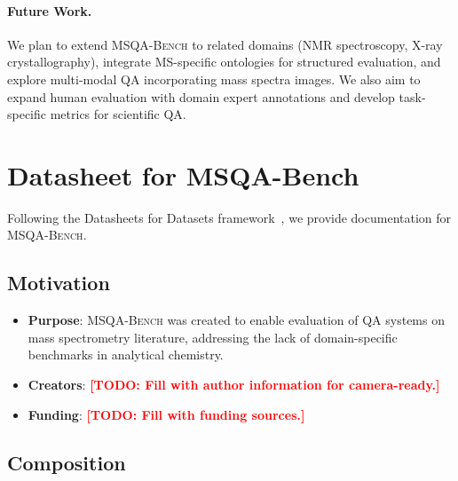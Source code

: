\documentclass[11pt]{article}
\newcommand{\msqa}{\textsc{MSQA-Bench}}
\newcommand{\todo}[1]{\textcolor{red}{\textbf{[TODO: #1]}}}
\begin{document}
\paragraph{Future Work.}
We plan to extend \msqa{} to related domains (NMR spectroscopy, X-ray crystallography), integrate MS-specific ontologies for structured evaluation, and explore multi-modal QA incorporating mass spectra images. We also aim to expand human evaluation with domain expert annotations and develop task-specific metrics for scientific QA.




\newpage
\appendix

\section{Datasheet for MSQA-Bench}
\label{app:datasheet}

Following the Datasheets for Datasets framework~\citep{gebru2021datasheets}, we provide documentation for \msqa{}.

\subsection{Motivation}

\begin{itemize}[leftmargin=*,itemsep=2pt]
    \item \textbf{Purpose}: \msqa{} was created to enable evaluation of QA systems on mass spectrometry literature, addressing the lack of domain-specific benchmarks in analytical chemistry.
    \item \textbf{Creators}: \todo{Fill with author information for camera-ready.}
    \item \textbf{Funding}: \todo{Fill with funding sources.}
\end{itemize}

\subsection{Composition}
\end{document}
